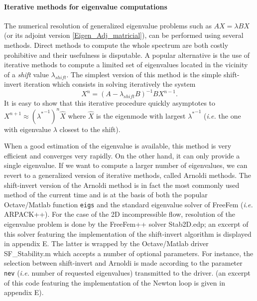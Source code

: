 \documentclass[twocolumn,10pt]{asme2ej}
\begin{document}

\paragraph{Iterative methods for eigenvalue computations}

The numerical resolution of generalized eigenvalue problems such as $A X = \lambda B X$ (or its adjoint version \eqref{Eigen_Adj_matricial}), 
can be performed using several methods. Direct methods to compute the whole spectrum are both costly prohibitive and their usefulness is disputable. A popular alternative is the use of iterative methods to compute a limited set of eigenvalues located in the vicinity of a 
{\em shift} value $\lambda_{shift}$. The simplest version of this method is the simple shift-invert iteration which consists in solving iteratively the system
$$
X^{n} =  (A- \lambda_{shift} B)^{-1} B X^{n-1}.
$$ 
It is easy to show that this iterative procedure quickly asymptotes to $X^{n+1} \approx ({\lambda^*}^{-1})^n \hat{X}$
where $\hat{X}$ is the eigenmode with largest ${\lambda^*}^{-1}$ (\textit{i.e.} the one with eigenvalue $\lambda$ closest to the shift). 


When a good estimation of the eigenvalue is available, this method is very efficient and converges very rapidly. On the other hand, it can only provide a single eigenvalue. If we want to compute a larger number of eigenvalues, we can revert to a generalized version of iterative methods, called Arnoldi methods\cite{Arnoldi51}. The shift-invert version of the Arnoldi method is in fact the most commonly used method of the current time and is at the basis of both the popular Octave/Matlab function {\tt{eigs}} and the standard eigenvalue solver of FreeFem (\textit{i.e.} ARPACK++). 
For the case of the 2D incompressible flow, resolution of the eigenvalue problem is done by the FreeFem++ solver {\sf  Stab2D.edp}; an excerpt of this solver featuring the implementation of the shift-invert algorithm is displayed in appendix E. The latter is wrapped by the Octave/Matlab driver {\sf  SF\_Stability.m} which accepts a number of optional parameters. For instance, the selection between shift-invert and Arnoldi is made according to the parameter \verb|nev|  (\textit{i.e.} number of requested eigenvalues) transmitted to the driver.
(an excerpt of this code featuring the implementation of the Newton loop is given in appendix E).
\end{document}
